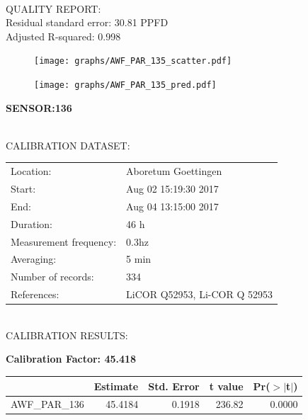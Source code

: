 \documentclass[oneside]{report}
\begin{document}
\hrulefill\\
QUALITY REPORT:\\
Residual standard error: 30.81 PPFD\\
Adjusted R-squared: 0.998



\begin{figure}[H]
  \centering
  \texttt{[image: graphs/AWF\_PAR\_135\_scatter.pdf]}
\end{figure}




\begin{figure}[H]
  \centering
  \texttt{[image: graphs/AWF\_PAR\_135\_pred.pdf]}
\end{figure}

\pagebreak


\begin{center}
\large{\textbf{SENSOR:136}}\\
\end{center}

\hrulefill\\
CALIBRATION DATASET:\\
\begin{table}[h!]
  \centering
  \label{tab:table1}
  \begin{tabular}{ll}
    Location: & Aboretum Goettingen\\ 
    
    
    Start:  & Aug 02 15:19:30 2017 \\
    End:   & Aug 04 13:15:00 2017\\ 
    Duration: & 46 h\\
    Measurement frequency: & 0.3hz\\
    Averaging:  &5 min\\
    Number of records: & 334 \\
    References: & LiCOR Q52953, Li-COR Q 52953 \\
  \end{tabular}
\end{table}

\hrulefill\\
CALIBRATION RESULTS:\\


\begin{center}
\textbf{\large{Calibration Factor: 45.418}}\\
\end{center}
\begin{table}[ht]
\centering
\begin{tabular}{rrrrr}
  \hline
 & Estimate & Std. Error & t value & Pr($>$$|$t$|$) \\ 
  \hline
AWF\_PAR\_136 & 45.4184 & 0.1918 & 236.82 & 0.0000 \\ 
   \hline
\end{tabular}
\end{table}
\end{document}
